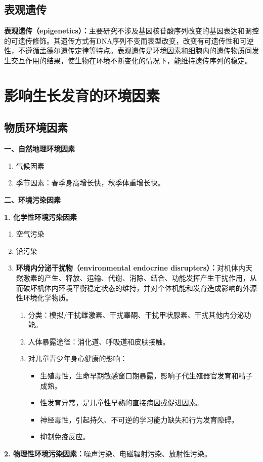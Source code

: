 \subsection{表观遗传}

\begin{defbox}
\textbf{表观遗传（epigenetics）：}主要研究不涉及基因核苷酸序列改变的基因表达和调控的可遗传修饰。其遗传方式有DNA序列不变而表型改变，改变有可遗传性和可逆性，不遵循孟德尔遗传定律等特点。表观遗传是环境因素和细胞内的遗传物质间发生交互作用的结果，使生物在环境不断变化的情况下，能维持遗传序列的稳定。
\end{defbox}

\section{影响生长发育的环境因素}\difficulty

\subsection{物质环境因素}

\begin{keybox}
\textbf{一、自然地理环境因素}
\begin{enumerate}[leftmargin=*]
    \item 气候因素
    \item 季节因素：春季身高增长快，秋季体重增长快。
\end{enumerate}

\textbf{二、环境污染因素}

\textbf{1. 化学性环境污染因素}
\begin{enumerate}[leftmargin=*]
    \item 空气污染
    \item 铅污染
    \item \textbf{环境内分泌干扰物（environmental endocrine disrupters）：}对机体内天然激素的产生、释放、运输、代谢、消除、结合、功能发挥产生干扰作用，从而破坏机体内环境平衡稳定状态的维持，并对个体机能和发育造成影响的外源性环境化学物质。
    \begin{enumerate}[leftmargin=*]
        \item 分类：模拟/干扰雌激素、干扰睾酮、干扰甲状腺素、干扰其他内分泌功能。
        \item 人体暴露途径：消化道、呼吸道和皮肤接触。
        \item 对儿童青少年身心健康的影响：
        \begin{itemize}
            \item 生殖毒性，生命早期敏感窗口期暴露，影响子代生殖器官发育和精子成熟。
            \item 性发育异常，是儿童性早熟的直接病因或促进因素。
            \item 神经毒性，引起持久、不可逆的学习能力缺失和行为发育障碍。
            \item 抑制免疫反应。
        \end{itemize}
    \end{enumerate}
\end{enumerate}

\textbf{2. 物理性环境污染因素：}噪声污染、电磁辐射污染、放射性污染。
\end{keybox}

